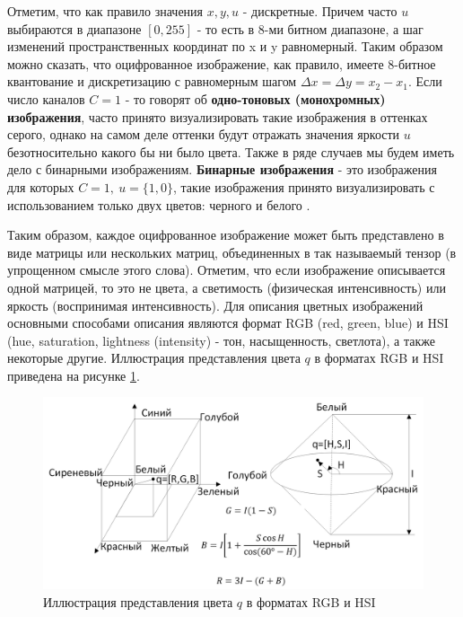 \documentclass[12pt]{article}
\begin{document}
\begin{sloppypar}
Отметим, что как правило значения $x,y,u$ - дискретные. 
Причем часто $u$ выбираются в диапазоне $[0,255]$ - то есть в 8-ми битном диапазоне, а шаг изменений пространственных координат по x и y равномерный. 
Таким образом можно сказать, что оцифрованное изображение, как правило, имеете 8-битное квантование и дискретизацию с равномерным шагом $\Delta x = \Delta y = x_2-x_1$.  Если число каналов $C=1$ - то говорят об \textbf{одно-тоновых (монохромных) изображения}, часто принято визуализировать такие изображения в оттенках серого, однако на самом деле оттенки будут отражать значения яркости $u$ безотносительно какого бы ни было цвета. 
Также в ряде случаев мы будем иметь дело с бинарными изображениям. \textbf{Бинарные изображения} -  это изображения для которых $C=1, \ u= \{1,0\}$, такие изображения принято визуализировать с использованием только двух цветов: черного и белого \cite{Kettler2019computer}. 

Таким образом, каждое оцифрованное изображение может быть представлено в виде матрицы или нескольких матриц, объединенных в так называемый тензор (в упрощенном смысле этого слова). Отметим, что если изображение описывается одной матрицей, то это не цвета, а светимость (физическая интенсивность) или яркость (воспринимая интенсивность). Для описания цветных изображений основными способами описания являются формат RGB (red, green, blue) и HSI (hue, saturation, lightness (intensity) - тон, насыщенность, светлота), а также некоторые другие. Иллюстрация представления цвета $q$ в форматах RGB и HSI приведена на рисунке \ref{ch2:fig:rgb_hsi}\cite{Kettler2019computer}.

    \begin{figure}[h]
    	\begin{center}
    		\includegraphics[width=0.99\linewidth]{./figuresch2/RGB_HSI.png}
    		\caption{Иллюстрация представления цвета $q$ в форматах RGB и HSI}		
    		\label{ch2:fig:rgb_hsi}
    	\end{center}
    \end{figure}


\end{sloppypar}
\end{document}
